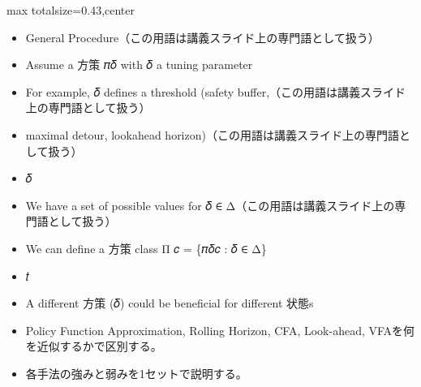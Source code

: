 \clearpage
{}
\begin{minipage}[t]{0.405\textwidth}
\begin{adjustbox}{max totalsize={\textwidth}{0.43\textheight},center}
\begin{minipage}{\textwidth}\scriptsize
{}\begin{itemize}
\item General Procedure（この用語は講義スライド上の専門語として扱う）
\item Assume a 方策 𝜋𝛿 with 𝛿 a tuning parameter
\item For example, 𝛿 defines a threshold (safety buffer,（この用語は講義スライド上の専門語として扱う）
\item maximal detour, lookahead horizon)（この用語は講義スライド上の専門語として扱う）
\item 𝛿
\item We have a set of possible values for 𝛿 ∈ Δ（この用語は講義スライド上の専門語として扱う）
\item We can define a 方策 class Π 𝑐 = \{𝜋𝛿𝑐 : 𝛿 ∈ Δ\}
\item 𝑡
\item A different 方策 (𝛿) could be beneficial for different 状態s
\end{itemize}\begin{itemize}
\item Policy Function Approximation, Rolling Horizon, CFA, Look-ahead, VFAを何を近似するかで区別する。
\item 各手法の強みと弱みを1セットで説明する。
\end{itemize}
\end{minipage}
\end{adjustbox}
\end{minipage}\hfill
